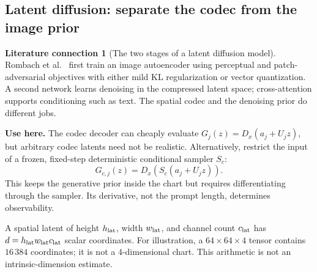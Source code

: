 \documentclass[11pt,a4paper]{article}
\theoremstyle{definition}
\theoremstyle{definition}
\newtheorem{literature}[theorem]{Literature connection}
\theoremstyle{remark}\newtheorem{remark}[theorem]{Remark}
\begin{document}
\subsection{Latent diffusion: separate the codec from the image prior}

\begin{literature}[The two stages of a latent diffusion model]\label{lit:ldm}
Rombach et al.~\cite{ldm} first train an image autoencoder using perceptual and patch-adversarial objectives with either mild KL regularization or vector quantization. A second network learns denoising in the compressed latent space; cross-attention supports conditioning such as text. The spatial codec and the denoising prior do different jobs.

\textbf{Use here.} The codec decoder can cheaply evaluate $G_j(z)=D_x(a_j+U_jz)$, but arbitrary codec latents need not be realistic. Alternatively, restrict the input of a frozen, fixed-step deterministic conditional sampler $S_c$:
\[
G_{c,j}(z)=D_x(S_c(a_j+U_jz)).
\]
This keeps the generative prior inside the chart but requires differentiating through the sampler. Its derivative, not the prompt length, determines observability.

A spatial latent of height $h_{\rm lat}$, width $w_{\rm lat}$, and channel count $c_{\rm lat}$ has $d=h_{\rm lat}w_{\rm lat}c_{\rm lat}$ scalar coordinates. For illustration, a $64\times64\times4$ tensor contains $16\,384$ coordinates; it is not a $4$-dimensional chart. This arithmetic is not an intrinsic-dimension estimate.
\end{literature}
\end{document}

